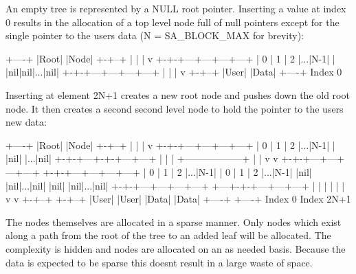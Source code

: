 An empty tree is represented by a NULL root pointer. Inserting a value at index 0 results in the allocation of a top level node full of null pointers except for the single pointer to the user\textquotesingle{}s data (N = SA\+\_\+\+BLOCK\+\_\+\+MAX for brevity)\+: \begin{DoxyVerb}    +----+
    |Root|
    |Node|
    +-+--+
      |
      |
      |
      v
    +-+-+---+---+---+---+
    | 0 | 1 | 2 |...|N-1|
    |   |nil|nil|...|nil|
    +-+-+---+---+---+---+
      |
      |
      |
      v
    +-+--+
    |User|
    |Data|
    +----+
Index 0
\end{DoxyVerb}
 Inserting at element 2N+1 creates a new root node and pushes down the old root node. It then creates a second second level node to hold the pointer to the user\textquotesingle{}s new data\+: \begin{DoxyVerb}    +----+
    |Root|
    |Node|
    +-+--+
      |
      |
      |
      v
    +-+-+---+---+---+---+
    | 0 | 1 | 2 |...|N-1|
    |   |nil|   |...|nil|
    +-+-+---+-+-+---+---+
      |       |
      |       +------------------+
      |                          |
      v                          v
    +-+-+---+---+---+---+      +-+-+---+---+---+---+
    | 0 | 1 | 2 |...|N-1|      | 0 | 1 | 2 |...|N-1|
    |nil|   |nil|...|nil|      |nil|   |nil|...|nil|
    +-+-+---+---+---+---+      +---+-+-+---+---+---+
      |                              |
      |                              |
      |                              |
      v                              v
    +-+--+                         +-+--+
    |User|                         |User|
    |Data|                         |Data|
    +----+                         +----+
Index 0                       Index 2N+1
\end{DoxyVerb}
 The nodes themselves are allocated in a sparse manner. Only nodes which exist along a path from the root of the tree to an added leaf will be allocated. The complexity is hidden and nodes are allocated on an as needed basis. Because the data is expected to be sparse this doesn\textquotesingle{}t result in a large waste of space.

